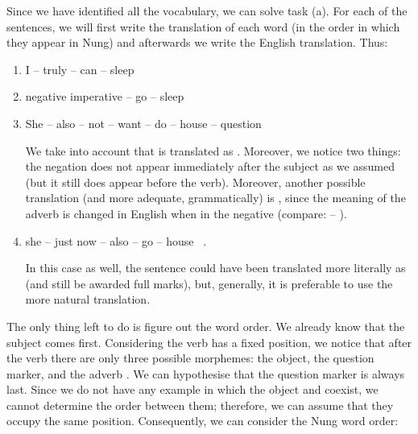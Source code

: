 \begin{refsection}
\begin{mysolution}
\begin{description}[labelwidth=\widthof{\bfseries Step 3.},leftmargin=!]
\item[Step 6.] Since we have identified all the vocabulary, we can solve task (a). For each of the sentences, we will first write the translation of each word (in the order in which they appear in Nung) and afterwards we write the English translation. Thus:

\begin{enumerate}[start = 13]
    \item I -- truly -- can -- sleep \Rightarrow\ 
    \item negative imperative -- go -- sleep \Rightarrow\ 
    \item She -- also -- not -- want -- do -- house -- question \Rightarrow\ 

    We take into account that  is translated as . Moreover, we notice two things: the negation  does not appear immediately after the subject as we assumed (but it still does appear before the verb). Moreover, another possible translation (and more adequate, grammatically) is , since the meaning of the adverb  is changed in English when in the negative (compare:  -- ).
    \item she -- just now -- also -- go -- house \Rightarrow\ .

 In this case as well, the sentence could have been translated more literally as  (and still be awarded full marks), but, generally, it is preferable to use the more natural translation.
\end{enumerate}

 \item[Step 7.] The only thing left to do is figure out the word order. We already know that the subject comes first. Considering the verb has a fixed position, we notice that after the verb there are only three possible morphemes: the object, the question marker, and the adverb . We can hypothesise that the question marker is always last. Since we do not have any example in which the object and  coexist, we cannot determine the order between them; therefore, we can assume that they occupy the same position. Consequently, we can consider the Nung word order:


\end{description}
\end{mysolution}
\end{refsection}
